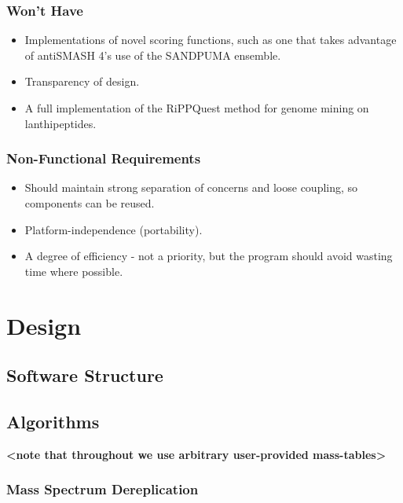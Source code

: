 \documentclass{l4proj}
\begin{document}
\subsection{Won't Have}

\begin{itemize}
\item Implementations of novel scoring functions, such as one that takes advantage of antiSMASH 4's use of the SANDPUMA ensemble.
\item Transparency of design.
\item A full implementation of the RiPPQuest method for genome mining on lanthipeptides.
\end{itemize}

\subsection{Non-Functional Requirements}

\begin{itemize}
\item Should maintain strong separation of concerns and loose coupling, so components can be reused.
\item Platform-independence (portability).
\item A degree of efficiency - not a priority, but the program should avoid wasting time where possible.
\end{itemize}

\chapter{Design}

\section{Software Structure}

\section{Algorithms}

\textbf{<note that throughout we use arbitrary user-provided mass-tables>}

\subsection{Mass Spectrum Dereplication}
\end{document}
